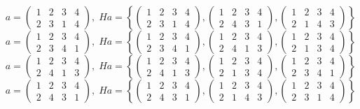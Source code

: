 \documentclass[a4paper,12pt]{article}
\begin{document}
\begin{itemize}
\[a = \begin{pmatrix} 1 & 2 & 3 & 4 \\ 2&3&1&4\end{pmatrix}, \; Ha = \left\{\begin{pmatrix} 1 & 2 & 3 & 4 \\ 2&3&1&4\end{pmatrix}, \begin{pmatrix} 1 & 2 & 3 & 4 \\ 2&4&3&1\end{pmatrix}, \begin{pmatrix} 1 & 2 & 3 & 4 \\ 2&1&4&3\end{pmatrix} \right\}\]
\[a = \begin{pmatrix} 1 & 2 & 3 & 4 \\ 2&3&4&1\end{pmatrix}, \; Ha = \left\{\begin{pmatrix} 1 & 2 & 3 & 4 \\ 2&3&4&1\end{pmatrix}, \begin{pmatrix} 1 & 2 & 3 & 4 \\ 2&4&1&3\end{pmatrix}, \begin{pmatrix} 1 & 2 & 3 & 4 \\ 2&1&3&4\end{pmatrix} \right\}\]
\[a = \begin{pmatrix} 1 & 2 & 3 & 4 \\ 2&4&1&3\end{pmatrix}, \; Ha = \left\{\begin{pmatrix} 1 & 2 & 3 & 4 \\ 2&4&1&3\end{pmatrix}, \begin{pmatrix} 1 & 2 & 3 & 4 \\ 2&1&3&4\end{pmatrix}, \begin{pmatrix} 1 & 2 & 3 & 4 \\ 2&3&4&1\end{pmatrix} \right\}\]
\[a = \begin{pmatrix} 1 & 2 & 3 & 4 \\ 2&4&3&1\end{pmatrix}, \; Ha = \left\{\begin{pmatrix} 1 & 2 & 3 & 4 \\ 2&4&3&1\end{pmatrix}, \begin{pmatrix} 1 & 2 & 3 & 4 \\ 2&1&4&3\end{pmatrix}, \begin{pmatrix} 1 & 2 & 3 & 4 \\ 2&3&1&4\end{pmatrix} \right\}\]

\end{itemize}
\end{document}
